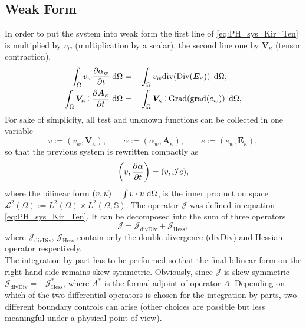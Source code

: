 \documentclass[letterpaper, 10 pt, conference]{ieeeconf}
\def\onedot{$\mathsurround0pt\ldotp$}
\def\cddot{%
	\mathbin{\vcenter{\baselineskip.67ex
			\hbox{\onedot}\hbox{\onedot}}%
}}
\begin{document}
\subsection{Weak Form}
\label{subsec:WF}
In order to put the system into weak form the first line of \eqref{eq:PH_sys_Kir_Ten} is multiplied  by $v_w$ (multiplication by a scalar), the second line one by $\bm{V}_{\kappa}$ (tensor contraction).
\begin{align}
\int_{\Omega} v_w \diffp{\alpha_w}{t}  \d\Omega &=  -\int_{\Omega} v_w \mathrm{div}(\mathrm{Div}(\bm{E}_\kappa)) \, \d\Omega,  \label{eq:wf1_Kir_ten}\\
\int_{\Omega} \bm{V}_{\kappa} \cddot \diffp{\bm{A}_{\kappa}}{t}   \d\Omega &= +\int_{\Omega} \bm{V}_{\kappa} \cddot \mathrm{Grad}(\mathrm{grad}(e_w)) \, \d\Omega, \label{eq:wf2_Kir_ten} 
\end{align}
For sake of simplicity, all test and unknown functions can be collected in one variable
\begin{equation}
v := (v_{w}, \bm{V}_{\kappa}), \qquad \alpha := (\alpha_{w}, \bm{A}_{\kappa}), \qquad e := (e_{w}, \bm{E}_{\kappa}),
\end{equation}
so that the previous system is rewritten compactly as
\begin{equation}
\left(v, \diffp{\alpha}{t}\right) = (v, \mathcal{J}e),
\end{equation}
where the bilinear form $(v,u) = \int v \cdot u \d{\Omega}$, is the inner product on space $\mathscr{L}^2(\Omega) := L^2(\Omega) \times L^2(\Omega; \mathbb{S}) $. The operator $\mathcal{J}$ was defined in equation \eqref{eq:PH_sys_Kir_Ten}. It can be decomposed into the sum of three operators
\begin{equation}
\mathcal{J} = \mathcal{J}_{\mathrm{divDiv}} + \mathcal{J}_{\mathrm{Hess}}, 
\end{equation}
where $\mathcal{J}_{\mathrm{divDiv}}, \, \mathcal{J}_{\mathrm{Hess}}$ contain only the double divergence ($\mathrm{divDiv}$) and Hessian operator respectively. \\
The integration by part has to be performed so that the final bilinear form on the right-hand side remains skew-symmetric. Obviously, since $\mathcal{J}$ is skew-symmetric $\mathcal{J}_{\mathrm{divDiv}} = - \mathcal{J}_{\mathrm{Hess}}^*$, where $A^*$ is the formal adjoint of operator $A$. Depending on which of the two differential operators is chosen for the integration by parts, two different boundary controls can arise \cite{BrugnoliKir} (other choices are possible but less meaningful under a physical point of view). 
\end{document}
